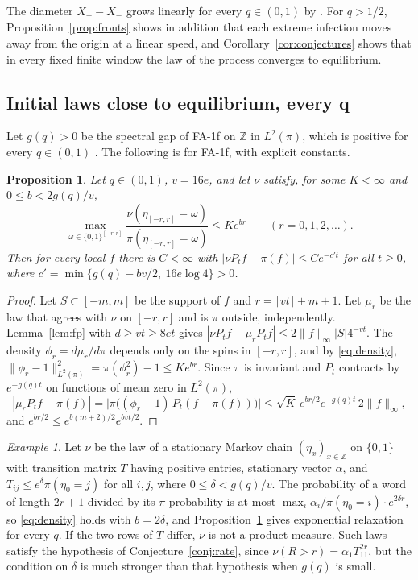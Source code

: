 \documentclass[11pt]{amsart}
\newtheorem{proposition}[theorem]{Proposition}
\theoremstyle{remark}
\newtheorem{example}[theorem]{Example}
\newcommand{\Z}{\mathbb{Z}}
\begin{document}
The diameter $X_+-X_-$ grows linearly for every $q\in(0,1)$ by \cite[Theorem~6.2]{MST25}. For $q>1/2$,
Proposition~\ref{prop:fronts} shows in addition that each extreme infection moves away from the origin at a linear
speed, and Corollary~\ref{cor:conjectures} shows that in every fixed finite window the law of the process converges to
equilibrium.

\subsection{Initial laws close to equilibrium, every q}
Let $g(q)>0$ be the spectral gap of FA-1f on $\Z$ in $L^2(\pi)$, which is positive for every $q\in(0,1)$
\cite{CMRT08}. The following is \cite[Theorem~2.1]{CMST10} for FA-1f, with explicit constants.

\begin{proposition}\label{prop:allq}
Let $q\in(0,1)$, $v=16e$, and let $\nu$ satisfy, for some $K<\infty$ and $0\le b<2g(q)/v$,
\begin{equation}\label{eq:density}
\max_{\omega\in\{0,1\}^{[-r,r]}}\frac{\nu(\eta_{[-r,r]}=\omega)}{\pi(\eta_{[-r,r]}=\omega)}\le Ke^{br}
\qquad(r=0,1,2,\dots).
\end{equation}
Then for every local $f$ there is $C<\infty$ with $|\nu P_tf-\pi(f)|\le Ce^{-c't}$ for all $t\ge0$, where
$c'=\min\{g(q)-bv/2,\ 16e\log4\}>0$.
\end{proposition}

\begin{proof}
Let $S\subset[-m,m]$ be the support of $f$ and $r=\lceil vt\rceil+m+1$. Let $\mu_r$ be the law that agrees with $\nu$
on $[-r,r]$ and is $\pi$ outside, independently. Lemma~\ref{lem:fp} with $d\ge vt\ge8et$ gives
$|\nu P_tf-\mu_rP_tf|\le2\|f\|_\infty|S|4^{-vt}$. The density $\phi_r=d\mu_r/d\pi$ depends only on the spins in
$[-r,r]$, and by \eqref{eq:density}, $\|\phi_r-1\|_{L^2(\pi)}^2=\pi(\phi_r^2)-1\le Ke^{br}$. Since $\pi$ is invariant and
$P_t$ contracts by $e^{-g(q)t}$ on functions of mean zero in $L^2(\pi)$,
\[
|\mu_rP_tf-\pi(f)|=\bigl|\pi\bigl((\phi_r-1)\,P_t(f-\pi(f))\bigr)\bigr|\le\sqrt K\,e^{br/2}e^{-g(q)t}\,2\|f\|_\infty,
\]
and $e^{br/2}\le e^{b(m+2)/2}e^{bvt/2}$.
\end{proof}

\begin{example}\label{ex:markov}
Let $\nu$ be the law of a stationary Markov chain $(\eta_x)_{x\in\Z}$ on $\{0,1\}$ with transition matrix $T$ having
positive entries, stationary vector $\alpha$, and $T_{ij}\le e^{\delta}\pi(\eta_0=j)$ for all $i,j$, where
$0\le\delta<g(q)/v$. The probability of a word of length $2r+1$ divided by its $\pi$-probability is at most
$\max_i\alpha_i/\pi(\eta_0=i)\cdot e^{2\delta r}$, so \eqref{eq:density} holds with $b=2\delta$, and
Proposition~\ref{prop:allq} gives exponential relaxation for every $q$. If the two rows of $T$ differ, $\nu$ is not
a product measure. Such laws satisfy the hypothesis of Conjecture~\ref{conj:rate}, since
$\nu(R>r)=\alpha_1T_{11}^{2r}$, but the condition on $\delta$ is much stronger than that hypothesis when $g(q)$ is
small.
\end{example}
\end{document}
